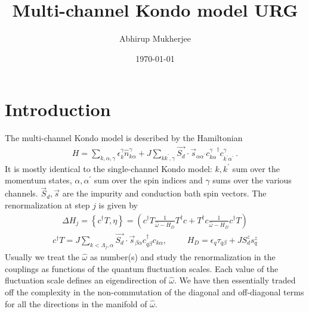 \documentclass{revtex4-2}
\numberwithin{equation}{section}
\begin{document}
\title{Multi-channel Kondo model URG}
\author{Abhirup Mukherjee}
\date{\today}
\maketitle
\section{Introduction}
The multi-channel Kondo model is described by the Hamiltonian
\begin{equation}\begin{aligned}
	H = \sum_{k,\alpha,\gamma}\epsilon_{k}^\gamma \hat n^\gamma_{k\alpha} + J\sum_{kk^\prime,\gamma} \vec{S_d}\cdot\vec{s}_{\alpha\alpha^\prime}{c^\gamma_{k\alpha}}^\dagger c^\gamma_{k^\prime\alpha^\prime}~.
\end{aligned}\end{equation}
It is mostly identical to the single-channel Kondo model: \(k,k^\prime\) sum over the momentum states, \(\alpha,\alpha^\prime\) sum over the spin indices and \(\gamma\) sums over the various channels. \(\vec S_d, \vec s\) are the impurity and conduction bath spin vectors. The renormalization at step \(j\) is given by
\begin{equation}\begin{aligned}
	\Delta H_j = \left\{c^\dagger T, \eta \right\} = \left(c^\dagger T \frac{1}{\hat \omega - H_D}T^\dagger c + T^\dagger c \frac{1}{\hat \omega - H_D}c^\dagger T\right)
\end{aligned}\end{equation}
\begin{equation}\begin{aligned}
	c^\dagger T = J \sum_{k < \Lambda_j, \alpha}\vec{S_d}\cdot\vec{s}_{\beta \alpha}c^\dagger_{q\beta}c_{k\alpha}, &&&H_D = \epsilon_q \tau_{q\beta} + J S_d^z s_q^z
\end{aligned}\end{equation}
Usually we treat the \(\hat \omega\) as number(s) and study the renormalization in the couplings as functions of the quantum fluctuation scales. Each value of the fluctuation scale defines an eigendirection of \(\hat \omega\). We have then essentially traded off the complexity in the non-commutation of the diagonal and off-diagonal terms for all the directions in the manifold of \(\hat \omega\).
\end{document}
